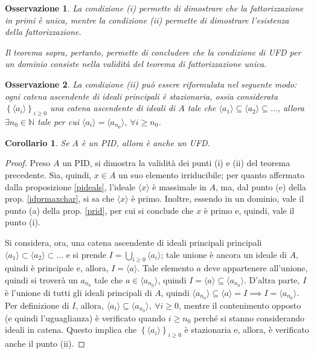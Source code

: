 \documentclass[12pt]{scrartcl}
\theoremstyle{style}
\newtheorem{corollario}{Corollario}[teorema]
\newtheorem{osservazione}{Osservazione}[section]
\numberwithin{equation}{subsection}
\begin{document}
\begin{osservazione}
La condizione (i) permette di dimostrare che la fattorizzazione in primi \`e unica, mentre la condizione (ii) permette di dimostrare l'esistenza della fattorizzazione.

Il teorema sopra, pertanto, permette di concludere che la condizione di UFD per un dominio consiste nella validit\`a del teorema di fattorizzazione unica.
\end{osservazione}
\begin{osservazione}
La condizione (ii) pu\`o essere riformulata nel seguente modo: ogni catena ascendente di ideali principali \`e stazionaria, ossia considerata $\left\{ \langle a_i \rangle \right\} _{i\ge 0} $ una catena ascendente di ideali di $A$ tale che $\langle a_1 \rangle\subseteq \langle a_2 \rangle\subseteq \ldots$, allora $\exists n_0 \in \mathbb{N}$ tale per cui $\langle a_i \rangle= \langle a_{n_0}  \rangle, \ \forall i\ge n_0$.
\end{osservazione}
\begin{corollario}
	Se $A$ \`e un PID, allora \`e anche un UFD.
\end{corollario}
	\begin{proof}
		Preso $A$ un PID, si dimostra la validit\`a dei punti (i) e (ii) del teorema precedente.
		Sia, quindi, $x \in A$ un suo elemento irriducibile; per quanto affermato dalla proposizione \ref{pideals}, l'ideale $\langle x \rangle$ \`e massimale in $A$, ma, dal punto (e) della prop. \ref{idprmaxchar}, si sa che $\langle x \rangle$ \`e primo.
		Inoltre, essendo in un dominio, vale il punto (a) della prop. \ref{prid}, per cui si conclude che $x$ \`e primo e, quindi, vale il punto (i).

		Si considera, ora, una catena ascendente di ideali principali principali $\langle a_1 \rangle\subset \langle a_2 \rangle\subset \ldots$ e si prende $I = \bigcup _{i\ge 0} \langle a_i \rangle$; tale unione \`e ancora un ideale di $A$, quindi \`e principale e, allora, $I = \langle a \rangle$.
		Tale elemento $a$ deve appartenere all'unione, quindi si trover\`a un $a_{n_0} $ tale che $a \in \langle a_{n_0}  \rangle$, quindi $I = \langle a \rangle\subseteq \langle a_{n_0}  \rangle$.
		D'altra parte, $I$ \`e l'unione di tutti gli ideali principali di $A$, quindi $\langle a_{n_0}  \rangle\subseteq \langle a \rangle= I \implies I = \langle a_{n_0}  \rangle$.
		Per definizione di $I$, allora, $\langle a_i \rangle\subseteq \langle a_{n_0}  \rangle, \ \forall i\ge 0$, mentre il contenimento opposto (e quindi l'uguaglianza) \`e verificato quando $i\ge n_0$ perch\'e si stanno considerando ideali in catena.
		Questo implica che $\left\{ \langle a_i \rangle \right\} _{i\ge 0} $ \`e stazionaria e, allora, \`e verificato anche il punto (ii).
	\end{proof}
\end{document}

